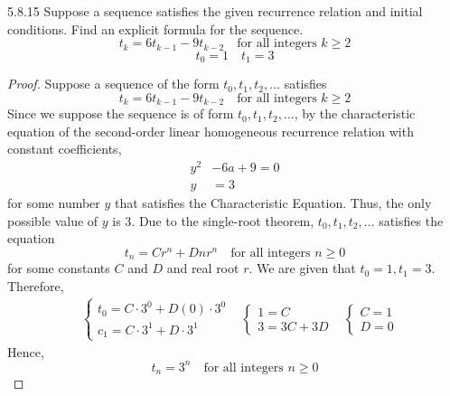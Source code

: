 \begin{question}
    {5.8.15}
    {
        Suppose a sequence satisfies the given recurrence relation and initial conditions. Find an explicit formula for the sequence.
        \begin{equation*}
            t_k = 6t_{k-1} - 9t_{k-2} \quad \text{for all integers $k \geq 2$}
        \end{equation*}
        \begin{equation*}
            t_0 = 1 \quad t_1=3
        \end{equation*}
    }
\end{question}
\begin{proof}
    Suppose a sequence of the form $t_0, t_1, t_2, \ldots$ satisfies 
    \begin{equation*}
        t_k = 6t_{k-1} - 9t_{k-2} \quad \text{for all integers $k \geq 2$}
    \end{equation*}
    Since we suppose the sequence is of form $t_0, t_1, t_2, \ldots$, by the characteristic equation of the second-order linear homogeneous recurrence relation with constant coefficients,
    \begin{align*}
        y^2 &- 6a + 9 = 0 \\
        y &= 3
    \end{align*}
    for some number $y$ that satisfies the Characteristic Equation. 
    Thus, the only possible value of $y$ is 3.
    Due to the single-root theorem, $t_0, t_1, t_2, \ldots$ satisfies the equation
    \begin{equation*}
        t_n = Cr^n + Dnr^n \quad \text{for all integers $n \geq 0$}
    \end{equation*}
    for some constants $C$ and $D$ and real root $r$.
    We are given that $t_0 = 1, t_1 = 3$. Therefore,
    \begin{align*}
        &\begin{cases}
            t_0 = C\cdot 3^0 + D(0)\cdot 3^0 \\
            c_1 = C\cdot 3^1 + D\cdot 3^1
        \end{cases}
        &\begin{cases} 
            1 = C \\ 
            3 = 3C + 3D
        \end{cases}
        &\begin{cases} 
            C = 1 \\ 
            D = 0
        \end{cases}
    \end{align*}
    Hence,
    \begin{equation*}
        t_n = 3^n \quad \text{for all integers $n \geq 0$}
    \end{equation*}
\end{proof}

